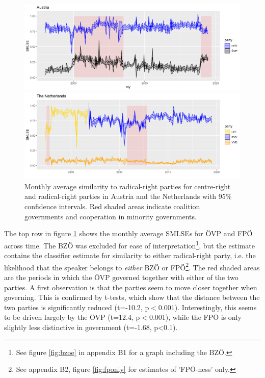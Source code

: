 \documentclass{article}
\begin{document}
\begin{figure}
\begin{minipage}{\textwidth}
\includegraphics[width=\linewidth]{AT/vis/AT_fpvp_paper.png}
\end{minipage}
\hfill
\begin{minipage}{\textwidth}
\includegraphics[width=\linewidth]{NL/vis/nl_vvd_rr_paper.png}
\end{minipage}
\caption{Monthly average similarity to radical-right parties for centre-right and radical-right parties in Austria and the Netherlands with 95\% confidence intervals. Red shaded areas indicate coalition governments and cooperation in minority governments.}
\label{fig:govs}
\end{figure}

The top row in figure \ref{fig:govs} shows the monthly average SMLSEs for ÖVP and FPÖ across time. The BZÖ was excluded for ease of interpretation\footnote{See figure \ref{fig:bzoe} in appendix B1 for a graph including the BZÖ.}, but the estimate contains the classifier estimate for similarity to either radical-right party, i.e. the likelihood that the speaker belongs to \textit{either} BZÖ or FPÖ\footnote{See appendix B2, figure \ref{fig:fponly} for estimates of 'FPÖ-ness' only.}. The red shaded areas are the periods in which the ÖVP governed together with either of the two parties. A first observation is that the parties seem to move closer together when governing. This is confirmed by t-tests, which show that the distance between the two parties is significantly reduced (t=-10.2, p$<$0.001). Interestingly, this seems to be driven largely by the ÖVP (t=12.4, p$<$0.001), while the FPÖ is only slightly less distinctive in government (t=-1.68, p<0.1). \par
\end{document}
